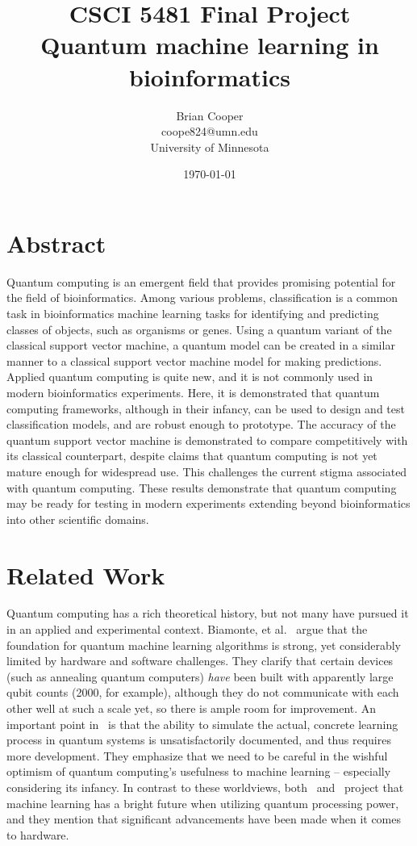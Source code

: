 \documentclass{article}
\title{%
  CSCI 5481 Final Project \\
  \large Quantum machine learning in bioinformatics
}
\author{Brian Cooper \\ coope824@umn.edu \\ University of Minnesota}
\date{\today}
\begin{document}
\maketitle

\section{Abstract}
  Quantum computing is an emergent field that provides promising potential for the field of bioinformatics. Among various problems, classification is a common task in bioinformatics machine learning tasks for identifying and predicting classes of objects, such as organisms or genes. Using a quantum variant of the classical support vector machine, a quantum model can be created in a similar manner to a classical support vector machine model for making predictions. Applied quantum computing is quite new, and it is not commonly used in modern bioinformatics experiments. Here, it is demonstrated that quantum computing frameworks, although in their infancy, can be used to design and test classification models, and are robust enough to prototype. The accuracy of the quantum support vector machine is demonstrated to compare competitively with its classical counterpart, despite claims that quantum computing is not yet mature enough for widespread use. This challenges the current stigma associated with quantum computing. These results demonstrate that quantum computing may be ready for testing in modern experiments extending beyond bioinformatics into other scientific domains.

\section{Related Work}
  Quantum computing has a rich theoretical history, but not many have pursued it in an applied and experimental context. Biamonte, et al.~\cite{biamonte} argue that the foundation for quantum machine learning algorithms is strong, yet considerably limited by hardware and software challenges. They clarify that certain devices (such as annealing quantum computers) \textit{have} been built with apparently large qubit counts (2000, for example), although they do not communicate with each other well at such a scale yet, so there is ample room for improvement. An important point in~\cite{schuld} is that the ability to simulate the actual, concrete learning process in quantum systems is unsatisfactorily documented, and thus requires more development. They emphasize that we need to be careful in the wishful optimism of quantum computing's usefulness to machine learning -- especially considering its infancy. In contrast to these worldviews, both~\cite{biamonte} and~\cite{schuld} project that machine learning has a bright future when utilizing quantum processing power, and they mention that significant advancements have been made when it comes to hardware.
\end{document}

